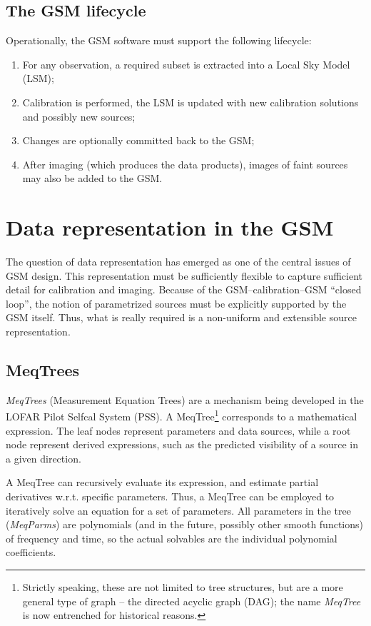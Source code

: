 \documentclass[11pt,twoside]{article}  %
\begin{document}
\subsection{The GSM lifecycle}

Operationally, the GSM software must support the following lifecycle:

\begin{enumerate}
\item For any observation, a required subset is extracted into a Local Sky Model
(LSM);
\item Calibration is performed, the LSM is updated with new calibration
solutions and possibly new sources;
\item Changes are optionally committed back to the GSM;
\item After imaging (which produces the data products), images of faint sources
may also be added to the GSM.
\end{enumerate}

\section{Data representation in the GSM}

The question of data representation has emerged as one of the central issues of
GSM design. This representation must be sufficiently flexible to capture
sufficient detail for calibration and imaging. Because of the 
GSM--calibration--GSM ``closed loop'', the notion of parametrized sources must
be explicitly supported by the GSM itself. Thus, what is really required is a
non-uniform and extensible source representation.

\subsection{MeqTrees}

{\em MeqTrees} (Measurement Equation Trees) are a mechanism being developed in
the LOFAR Pilot Selfcal System (PSS). A MeqTree\footnote{Strictly speaking,
these are not limited to tree structures, but are a more general type of graph
-- the directed acyclic graph (DAG); the name {\em MeqTree} is now entrenched
for historical reasons.} corresponds to a mathematical expression. The leaf
nodes represent parameters and data sources, while a root node represent 
derived expressions, such as the predicted visibility of a source in a given
direction.

A MeqTree can recursively evaluate its expression, and estimate partial
derivatives w.r.t. specific parameters. Thus, a MeqTree can be employed to
iteratively solve an equation for a set of parameters. All parameters in the
tree ({\em MeqParms\/}) are polynomials (and in the future, possibly other
smooth functions) of frequency and time, so the actual solvables are the
individual polynomial coefficients.
\end{document}
